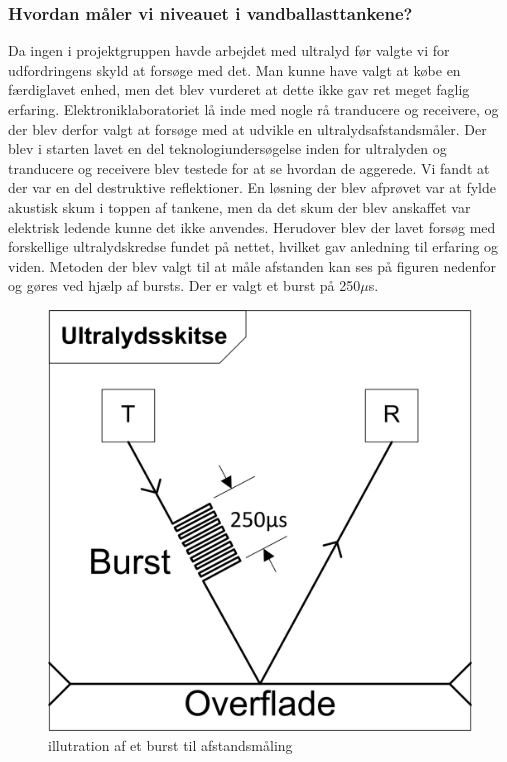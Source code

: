 \subsubsection{Hvordan måler vi niveauet i vandballasttankene?}
Da ingen i projektgruppen havde arbejdet med ultralyd før valgte vi for udfordringens skyld at forsøge med det. Man kunne have valgt at købe en færdiglavet enhed, men det blev vurderet at dette ikke gav ret meget faglig erfaring. Elektroniklaboratoriet lå inde med nogle rå tranducere og receivere, og der blev derfor valgt at forsøge med at udvikle en ultralydsafstandsmåler. Der blev i starten lavet en del teknologiundersøgelse inden for ultralyden og tranducere og receivere blev testede for at se hvordan de aggerede. Vi fandt at der var en del destruktive reflektioner. En løsning der blev afprøvet var at fylde akustisk skum i toppen af tankene, men da det skum der blev anskaffet var elektrisk ledende kunne det ikke anvendes. Herudover blev der lavet forsøg med forskellige ultralydskredse fundet på nettet, hvilket gav anledning til erfaring og viden. Metoden der blev valgt til at måle afstanden kan ses på figuren nedenfor og gøres ved hjælp af bursts. Der er valgt et burst på 250$\mu$s.
\begin{figure}[H]
\centering
\includegraphics[width=.4\textwidth]{billeder/ultralydsburst}
\caption{illutration af et burst til afstandsmåling}
\end{figure}

